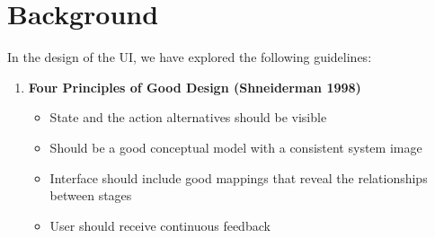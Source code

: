 \documentclass{article}
\begin{document}
\section{Background}
In the design of the UI, we have explored the following guidelines:
\begin{enumerate}
\item{\bf Four Principles of Good Design (Shneiderman 1998)}
\begin{itemize}
\item State and the action alternatives should be visible
\item Should be a good conceptual model with a consistent system image
\item Interface should include good mappings that reveal the relationships between stages
\item User should receive continuous feedback
\end{itemize}


\end{enumerate}
\end{document}
